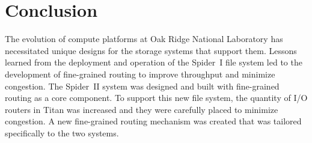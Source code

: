 \section{Conclusion}

The evolution of compute platforms at Oak Ridge National Laboratory has
necessitated unique designs for the storage systems that support them.  Lessons
learned from the deployment and operation of the Spider~I file system led to
the development of fine-grained routing to improve throughput and minimize
congestion.  The Spider~II system was designed and built with fine-grained
routing as a core component.  To support this new file system, the quantity of
I/O routers in Titan was increased and they were carefully placed to minimize
congestion.  A new fine-grained routing mechanism was created that was tailored
specifically to the two systems.

